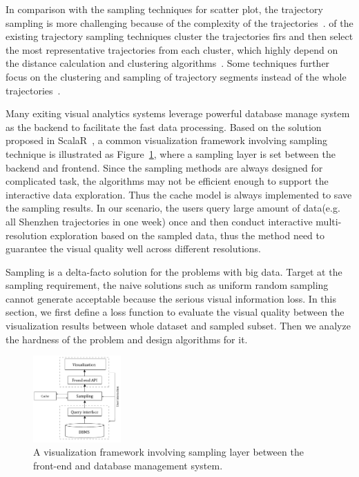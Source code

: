 In comparison with the sampling techniques for scatter plot, the trajectory sampling is more challenging because of the complexity of the trajectories~\cite{pelekis2010unsupervised}.  of the existing trajectory sampling techniques cluster the trajectories firs and then select the most representative trajectories from each cluster, which highly depend on the distance calculation and clustering algorithms~\cite{pelekis2007similarity}. Some techniques further focus on the clustering and sampling of trajectory segments instead of the whole trajectories~\cite{panagiotakis2011segmentation}.


Many exiting visual analytics systems leverage powerful database manage system as the backend to facilitate the fast data processing. Based on the solution proposed in ScalaR~\cite{battle2013dynamic}, a common visualization framework involving sampling technique is illustrated as Figure~\ref{fig:framework}, where a sampling layer is set between the backend and frontend. Since the sampling methods are always designed for complicated task, the algorithms may not be efficient enough to support the interactive data exploration. Thus the cache model is always implemented to save the sampling results. In our scenario, the users query large amount of data(e.g. all Shenzhen trajectories in one week) once and then conduct interactive multi-resolution exploration based on the sampled data, thus the method need to guarantee the visual quality well across different resolutions.

Sampling is a delta-facto solution for the problems with big data. Target at the sampling requirement, the naive solutions such as uniform random sampling cannot generate acceptable because the serious visual information loss. In this section, we first define a loss function to evaluate the visual quality between the visualization results between whole dataset and sampled subset. Then we analyze the hardness of the problem and design algorithms for it.


\begin{figure}[t]
	\centering
	\includegraphics[width=0.3\textwidth]{pictures/framework/DBVAframework.pdf}
	\vspace{-5mm}
	\caption{A visualization framework involving sampling layer between the front-end and database management system.}
	\vspace{-5mm}
	\label{fig:framework}
\end{figure}

